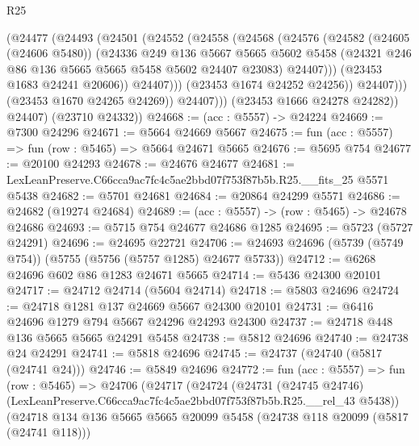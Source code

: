 \begin{lexlean}{R25}
\begin{coremodule}
                      (@24477
                        (@24493
                          (@24501
                            (@24552
                              (@24558
                                (@24568
                                  (@24576
                                    (@24582
                                      (@24605 (@24606 @5480))
                                      (@24336
                                        @249
                                        @136
                                        @5667
                                        @5665
                                        @5602
                                        @5458
                                        (@24321 @246 @86 @136 @5665 @5665 @5458 @5602 @24407 @23083)
                                        @24407)))
                                  (@23453 @1683 @24241 @20606))
                                @24407)))
                          (@23453 @1674 @24252 @24256))
                        @24407)))
                  (@23453 @1670 @24265 @24269))
                @24407)))
          (@23453 @1666 @24278 @24282))
        @24407)
      (@23710 @24332))
@24668 := (acc : @5557) -> @24224
@24669 := @7300 @24296
@24671 := @5664 @24669 @5667
@24675 := fun (acc : @5557) => fun (row : @5465) => @5664 @24671 @5665
@24676 := @5695 @754
@24677 := @20100 @24293
@24678 := @24676 @24677
@24681 := LexLeanPreserve.C66cca9ac7fc4c5ae2bbd07f753f87b5b.R25.__fits_25 @5571 @5438
@24682 := @5701 @24681
@24684 := @20864 @24299 @5571
@24686 := @24682 (@19274 @24684)
@24689 := (acc : @5557) -> (row : @5465) -> @24678 @24686
@24693 := @5715 @754 @24677 @24686 @1285
@24695 := @5723 (@5727 @24291)
@24696 := @24695 @22721
@24706 := @24693 @24696 (@5739 (@5749 @754)) (@5755 (@5756 (@5757 @1285) @24677 @5733))
@24712 := @6268 @24696 @602 @86 @1283 @24671 @5665
@24714 := @5436 @24300 @20101
@24717 := @24712 @24714 (@5604 @24714)
@24718 := @5803 @24696
@24724 := @24718 @1281 @137 @24669 @5667 @24300 @20101
@24731 := @6416 @24696 @1279 @794 @5667 @24296 @24293 @24300
@24737 := @24718 @448 @136 @5665 @5665 @24291 @5458
@24738 := @5812 @24696
@24740 := @24738 @24 @24291
@24741 := @5818 @24696
@24745 := @24737 (@24740 (@5817 (@24741 @24)))
@24746 := @5849 @24696
@24772 := fun (acc : @5557) =>
  fun (row : @5465) =>
  @24706
    (@24717
      (@24724
        (@24731
          (@24745 @24746)
          (LexLeanPreserve.C66cca9ac7fc4c5ae2bbd07f753f87b5b.R25.__rel_43 @5438))
        (@24718
          @134
          @136
          @5665
          @5665
          @20099
          @5458
          (@24738 @118 @20099 (@5817 (@24741 @118)))

\end{coremodule}
\end{lexlean}
